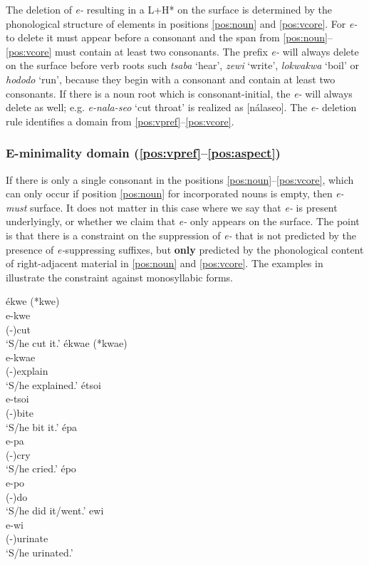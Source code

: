 \documentclass[output=paper,hidelinks]{langscibook}
\begin{document}
The deletion of \textit{e-} resulting in a L+H* on the surface is determined by the phonological structure of elements in positions \ref{pos:noun} and \ref{pos:vcore}. For \textit{e-} to delete it must appear before a consonant and the span from \ref{pos:noun}--\ref{pos:vcore} must contain at least two consonants. The prefix \textit{e-} will always delete on the surface before verb roots such \textit{tsaba} `hear', \textit{zewi} `write', \textit{lokwakwa} `boil' or \textit{hododo} `run', because they begin with a consonant and contain at least two consonants. If there is a noun root which is consonant-initial, the \textit{e-} will always delete as well; e.g. \textit{e-nala-seo} `cut throat' is realized as [nálaseo]. The \textit{e-} deletion rule identifies a domain from \ref{pos:vpref}--\ref{pos:vcore}.

\subsubsection{E-minimality domain (\ref{pos:vpref}--\ref{pos:aspect})}

If there is only a single consonant in the positions \ref{pos:noun}--\ref{pos:vcore}, which can only occur if position \ref{pos:noun} for incorporated nouns is empty, then \textit{e-} \textit{must} surface. It does not matter in this case where we say that \textit{e-} is present underlyingly, or whether we claim that \textit{e-} only appears on the surface. The point is that there is a constraint on the suppression of \textit{e-} that is not predicted by the presence of \textit{e-}suppressing suffixes, but \textbf{only} predicted by the phonological content of right-adjacent material in \ref{pos:noun} and \ref{pos:vcore}.
The examples in  illustrate the constraint against monosyllabic forms.

\ea 
 \ea \label{ekwe}
    ékwe \downarrow (*kwe) \\
    \gll e-kwe \\
    (\E{}-)cut \\
    \glt `S/he cut it.'
 \ex \label{ekwae}
    ékwae \downarrow (*kwae) \\
    \gll e-kwae \\
    (\E{}-)explain \\
    \glt `S/he explained.'
 \ex\label{etsoi}
    étsoi \downarrow \\
    \gll e-tsoi \\
    (\E{}-)bite \\
    \glt `S/he bit it.'
 \ex \label{epa}
    épa \downarrow \\
    \gll e-pa \\
    (\E{}-)cry \\
    \glt `S/he cried.'
 \ex\label{epo}
    épo \downarrow \\
    \gll e-po \\
    (\E{}-)do \\
    \glt `S/he did it/went.'
 \ex \label{ewi}
    ewi \downarrow \\
    \gll e-wi \\
    (\E{}-)urinate \\
    \glt `S/he urinated.'
 \z
\z 
\end{document}
